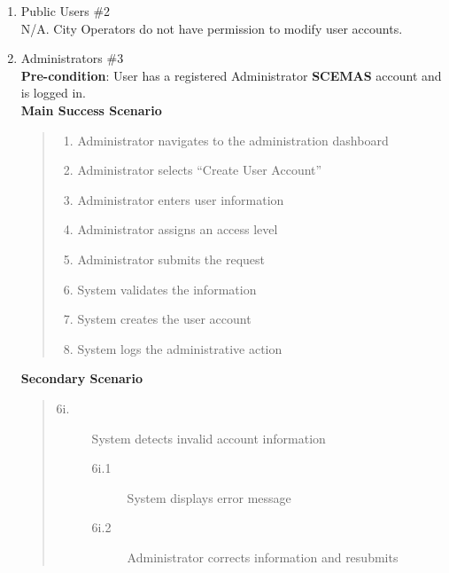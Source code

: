 \documentclass[]{article}
\begin{document}
\begin{enumerate}[{\bf BE9.}]
\begin{enumerate}[{\bf VP1.}]
            \item Public Users \#2\\
                N/A. City Operators do not have permission to modify user accounts.

			\item Administrators \#3\\
                \textbf{Pre-condition}: User has a registered Administrator \textbf{SCEMAS} account and is logged in. \\
                \textbf{Main Success Scenario}
                \begin{quote}
                    \begin{enumerate}[1.]
                        \item Administrator navigates to the administration dashboard
                        \item Administrator selects ``Create User Account''
                        \item Administrator enters user information
                        \item Administrator assigns an access level
                        \item Administrator submits the request
                        \item System validates the information
                        \item System creates the user account
                        \item System logs the administrative action
                    \end{enumerate}
                \end{quote}
                \textbf{Secondary Scenario}
                \begin{quote}
                    \begin{description}
                        \item[\textmd{6i.}] System detects invalid account information
                        \begin{description}
                            \item[\textmd{6i.1}] System displays error message
                            \item[\textmd{6i.2}] Administrator corrects information and resubmits
                        \end{description}
                    \end{description}
                \end{quote}


\end{enumerate}
\end{enumerate}
\end{document}

